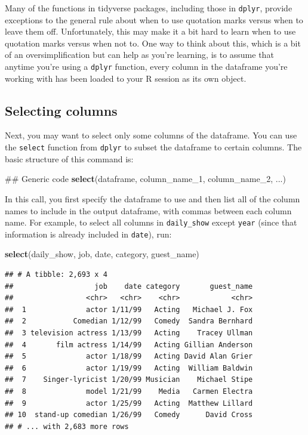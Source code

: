 \documentclass[]{book}
\makeatletter
\newenvironment{Shaded}{\begin{snugshade}}{\end{snugshade}}
\newcommand{\KeywordTok}[1]{\textcolor[rgb]{0.13,0.29,0.53}{\textbf{#1}}}
\newcommand{\DecValTok}[1]{\textcolor[rgb]{0.00,0.00,0.81}{#1}}
\newcommand{\NormalTok}[1]{#1}
\newenvironment{kframe}{%
\medskip{}
\setlength{\fboxsep}{.8em}
 \def\at@end@of@kframe{}%
 \ifinner\ifhmode%
  \def\at@end@of@kframe{\end{minipage}}%
  \begin{minipage}{\columnwidth}%
 \fi\fi%
 \def\FrameCommand##1{\hskip\@totalleftmargin \hskip-\fboxsep
 \colorbox{shadecolor}{##1}\hskip-\fboxsep
     \hskip-\linewidth \hskip-\@totalleftmargin \hskip\columnwidth}%
 \MakeFramed {\advance\hsize-\width
   \@totalleftmargin\z@ \linewidth\hsize
   \@setminipage}}%
 {\par\unskip\endMakeFramed%
 \at@end@of@kframe}
\renewenvironment{Shaded}{\begin{kframe}}{\end{kframe}}
\newenvironment{rmdblock}[1]
  {
  \begin{itemize}
  \renewcommand{\labelitemi}{
    \raisebox{-.7\height}[0pt][0pt]{
      {\setkeys{Gin}{width=3em,keepaspectratio}\texttt{[image: images/\#1]}}
    }
  }
  \setlength{\fboxsep}{1em}
  \begin{kframe}
  \item
  }
  {
  \end{kframe}
  \end{itemize}
  }
\newenvironment{rmdwarning}
  {\begin{rmdblock}{warning}}
  {\end{rmdblock}}
\theoremstyle{definition}
\theoremstyle{definition}
\theoremstyle{definition}
\theoremstyle{remark}
\makeatother
\begin{document}
\begin{rmdwarning}
Many of the functions in tidyverse packages, including those in
\texttt{dplyr}, provide exceptions to the general rule about when to use
quotation marks versus when to leave them off. Unfortunately, this may
make it a bit hard to learn when to use quotation marks versus when not
to. One way to think about this, which is a bit of an oversimplification
but can help as you're learning, is to assume that anytime you're using
a \texttt{dplyr} function, every column in the dataframe you're working
with has been loaded to your R session as its own object.
\end{rmdwarning}

\subsection{Selecting columns}\label{selecting-columns}

Next, you may want to select only some columns of the dataframe. You can
use the \texttt{select} function from \texttt{dplyr} to subset the
dataframe to certain columns. The basic structure of this command is:

\begin{Shaded}
\begin{Highlighting}[]
\NormalTok{## Generic code}
\KeywordTok{select}\NormalTok{(dataframe, column_name_}\DecValTok{1}\NormalTok{, column_name_}\DecValTok{2}\NormalTok{, ...)}
\end{Highlighting}
\end{Shaded}

In this call, you first specify the dataframe to use and then list all
of the column names to include in the output dataframe, with commas
between each column name. For example, to select all columns in
\texttt{daily\_show} except \texttt{year} (since that information is
already included in \texttt{date}), run:

\begin{Shaded}
\begin{Highlighting}[]
\KeywordTok{select}\NormalTok{(daily_show, job, date, category, guest_name)}
\end{Highlighting}
\end{Shaded}

\begin{verbatim}
## # A tibble: 2,693 x 4
##                   job    date category       guest_name
##                 <chr>   <chr>    <chr>            <chr>
##  1              actor 1/11/99   Acting   Michael J. Fox
##  2           Comedian 1/12/99   Comedy  Sandra Bernhard
##  3 television actress 1/13/99   Acting    Tracey Ullman
##  4       film actress 1/14/99   Acting Gillian Anderson
##  5              actor 1/18/99   Acting David Alan Grier
##  6              actor 1/19/99   Acting  William Baldwin
##  7    Singer-lyricist 1/20/99 Musician    Michael Stipe
##  8              model 1/21/99    Media   Carmen Electra
##  9              actor 1/25/99   Acting  Matthew Lillard
## 10  stand-up comedian 1/26/99   Comedy      David Cross
## # ... with 2,683 more rows
\end{verbatim}
\end{document}
